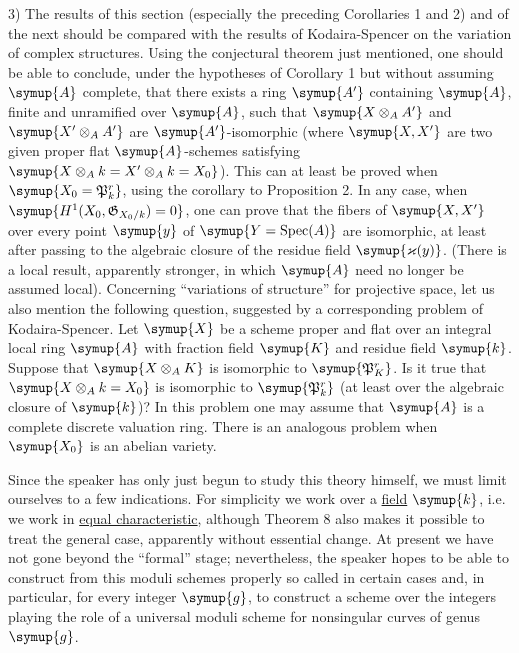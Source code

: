 3) The results of this section (especially the preceding Corollaries 1 and 2)
and of the next should be compared with the results of Kodaira-Spencer on the
variation of complex structures. Using the conjectural theorem just mentioned,
one should be able to conclude, under the hypotheses of Corollary 1 but without
assuming $\symup{A}$ complete, that there exists a ring $\symup{A'}$ containing $\symup{A}$, finite and
unramified over $\symup{A}$, such that $\symup{X\otimes_A A'}$ and $\symup{X'\otimes_A A'}$ are
$\symup{A'}$-isomorphic (where $\symup{X,X'}$ are two given proper flat $\symup{A}$-schemes satisfying
$\symup{X\otimes_A k=X'\otimes_A k=X_0}$). This can at least be proved when
$\symup{X_0=\mathfrak P_k^r}$, using the corollary to Proposition 2. In any case, when
$\symup{H^1(X_0,\mathfrak G_{X_0/k})=0}$, one can prove that the fibers of $\symup{X,X'}$ over every
point $\symup{y}$ of $\symup{Y=\operatorname{Spec}(A)}$ are isomorphic, at least after passing
to the algebraic closure of the residue field $\symup{\varkappa(y)}$. (There is a local
result, apparently stronger, in which $\symup{A}$ need no longer be assumed local).
Concerning “variations of structure” for projective space, let us also mention
the following question, suggested by a corresponding problem of
Kodaira-Spencer. Let $\symup{X}$ be a scheme proper and flat over an integral local
ring $\symup{A}$ with fraction field $\symup{K}$ and residue field $\symup{k}$. Suppose that
$\symup{X\otimes_A K}$ is isomorphic to $\symup{\mathfrak P_K^r}$. Is it true that
$\symup{X\otimes_A k=X_0}$ is isomorphic to $\symup{\mathfrak P_k^r}$ (at least over the
algebraic closure of $\symup{k}$)? In this problem one may assume that $\symup{A}$ is a
complete discrete valuation ring. There is an analogous problem when $\symup{X_0}$ is
an abelian variety.


Since the speaker has only just begun to study this theory himself, we must
limit ourselves to a few indications. For simplicity we work over a \uline{field}
$\symup{k}$, i.e. we work in \uline{equal characteristic}, although Theorem 8 also makes it possible
to treat the general case, apparently without essential change. At present we
have not gone beyond the “formal” stage; nevertheless, the speaker hopes to be
able to construct from this moduli schemes 
properly so called in certain cases and, in particular,
for every integer $\symup{g}$, to construct a scheme over the integers playing the
role of a universal moduli scheme for nonsingular curves of genus $\symup{g}$.


